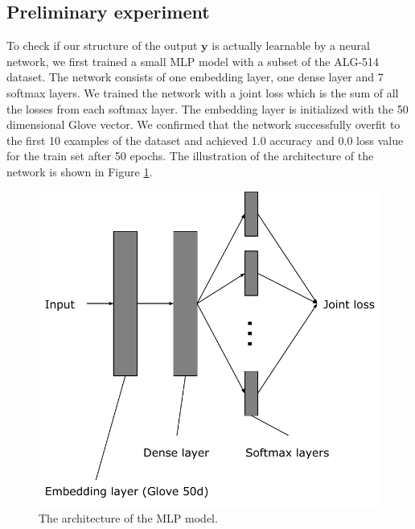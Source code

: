 \documentclass[11pt,letterpaper]{article}
\begin{document}
\subsection{Preliminary experiment}
To check if our structure of the output $\mathbf{y}$ is actually learnable by a neural network, we first trained a small MLP model with a subset of the ALG-514 dataset. The network consists of one embedding layer, one dense layer and 7 softmax layers. We trained the network with a joint loss which is the sum of all the losses from each softmax layer. The embedding layer is initialized with the 50 dimensional Glove vector. We confirmed that the network successfully overfit to the first 10 examples of the dataset and achieved 1.0 accuracy and 0.0 loss value for the train set after 50 epochs. The illustration of the architecture of the network is shown in Figure \ref{mlp}.
\begin{figure}[ht]
	\centering
	\includegraphics[bb=0 0 361 341, scale=0.5]{mlp.pdf}
    \caption{The architecture of the MLP model.}
    \label{mlp}
\end{figure}
%
\end{document}
